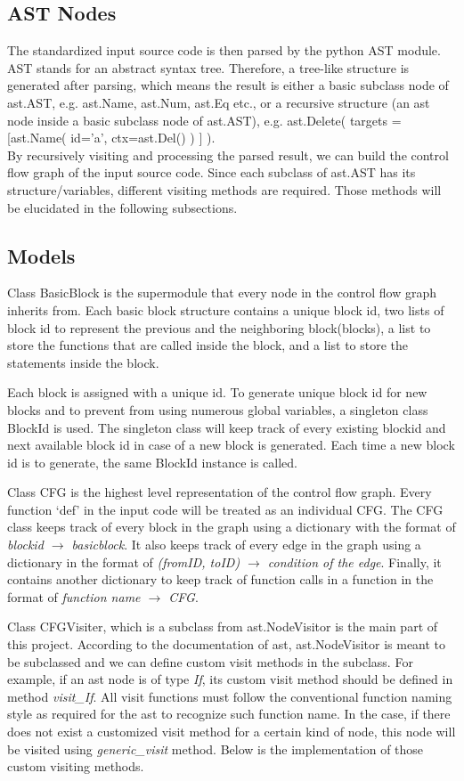 \documentclass[11pt]{article}
\begin{document}
\subsection{AST Nodes}
The standardized input source code is then parsed by the python AST module. AST stands for an abstract syntax tree. Therefore, a tree-like structure is generated after parsing, which means the result is either a basic subclass node of ast.AST, e.g. ast.Name, ast.Num, ast.Eq etc., or a recursive structure (an ast node inside a basic subclass node of ast.AST), e.g. ast.Delete( targets = [ast.Name( id='a', ctx=ast.Del() ) ] ). \\
By recursively visiting and processing the parsed result, we can build the control flow graph of the input source code. Since each subclass of ast.AST has its structure/variables, different visiting methods are required. Those methods will be elucidated in the following subsections.

\subsection{Models}
Class BasicBlock is the supermodule that every node in the control flow graph inherits from. Each basic block structure contains a unique block id, two lists of block id to represent the previous and the neighboring block(blocks), a list to store the functions that are called inside the block, and a list to store the statements inside the block.

Each block is assigned with a unique id. To generate unique block id for new blocks and to prevent from using numerous global variables, a singleton class BlockId is used. The singleton class will keep track of every existing blockid and next available block id in case of a new block is generated. Each time a new block id is to generate, the same BlockId instance is called.

Class CFG is the highest level representation of the control flow graph. Every function `def' in the input code will be treated as an individual CFG. The CFG class keeps track of every block in the graph using a dictionary with the format of \textit{blockid $\rightarrow$ basicblock}. It also keeps track of every edge in the graph using a dictionary in the format of \textit{(fromID, toID) $\rightarrow$ condition of the edge}. Finally, it contains another dictionary to keep track of function calls in a function in the format of \textit{function name $\rightarrow$ CFG}.

Class CFGVisiter, which is a subclass from ast.NodeVisitor is the main part of this project. According to the documentation of ast, ast.NodeVisitor is meant to be subclassed and we can define custom visit methods in the subclass. For example, if an ast node is of type \textit{If}, its custom visit method should be defined in method \textit{visit\_If}. All visit functions must follow the conventional function naming style as required for the ast to recognize such function name. In the case, if there does not exist a customized visit method for a certain kind of node, this node will be visited using \textit{generic\_visit} method. Below is the implementation of those custom visiting methods.
\end{document}
